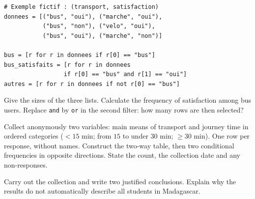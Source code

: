 \begin{lstlisting}
# Exemple fictif : (transport, satisfaction)
donnees = [("bus", "oui"), ("marche", "oui"),
           ("bus", "non"), ("velo", "oui"),
           ("bus", "oui"), ("marche", "non")]

bus = [r for r in donnees if r[0] == "bus"]
bus_satisfaits = [r for r in donnees
                 if r[0] == "bus" and r[1] == "oui"]
autres = [r for r in donnees if not r[0] == "bus"]
\end{lstlisting}
\begin{example}Give the sizes of the three lists. Calculate the frequency of satisfaction among bus users. Replace \texttt{and} by \texttt{or} in the second filter: how many rows are then selected?\end{example}
\begin{method}
Collect anonymously two variables: main means of transport and journey time in ordered categories ($<15$ min; from $15$ to under $30$ min; $\geq30$ min). One row per response, without names. Construct the two-way table, then two conditional frequencies in opposite directions. State the count, the collection date and any non-responses.
\end{method}
\begin{example}Carry out the collection and write two justified conclusions. Explain why the results do not automatically describe all students in Madagascar.\end{example}
